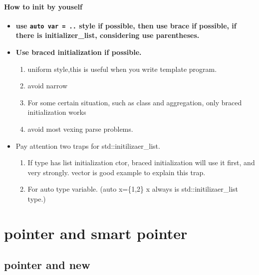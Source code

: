 \documentclass[a4paper,12pt,twoside]{book}
\begin{document}
\subsubsection{How to init by youself}
\begin{itemize}

	\item \textbf{use \texttt{auto var = ..} style if possible, then use brace if possible, if there is initializer\_list, considering use parentheses.}

	\item \textbf{Use braced initialization if possible.}
	\begin{enumerate}
		\item uniform style,this is useful when you write template program.
		\item avoid narrow
		\item  For some certain situation, such as class and aggregation, only braced initialization works
		\item avoid most vexing parse problems.
	\end{enumerate}

	\item Pay attention two traps for std::initilizaer\_list. 
	\begin{enumerate}
		\item If type has list initialization ctor, braced initialization will use it first, and very strongly. vector is good example to explain this trap.
		\item For auto type variable. (auto x=\{1,2\} x always is std::initilizaer\_list type.)
	\end{enumerate}
\end{itemize}

\chapter{pointer and smart pointer}

\section{pointer and new}
\end{document}
